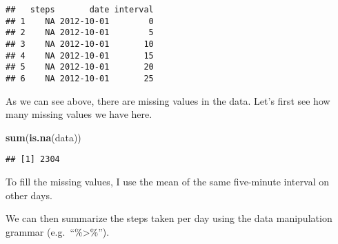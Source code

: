 \documentclass[
]{article}
\newenvironment{Shaded}{\begin{snugshade}}{\end{snugshade}}
\newcommand{\CommentTok}[1]{\textcolor[rgb]{0.56,0.35,0.01}{\textit{#1}}}
\newcommand{\ControlFlowTok}[1]{\textcolor[rgb]{0.13,0.29,0.53}{\textbf{#1}}}
\newcommand{\DataTypeTok}[1]{\textcolor[rgb]{0.13,0.29,0.53}{#1}}
\newcommand{\DecValTok}[1]{\textcolor[rgb]{0.00,0.00,0.81}{#1}}
\newcommand{\KeywordTok}[1]{\textcolor[rgb]{0.13,0.29,0.53}{\textbf{#1}}}
\newcommand{\NormalTok}[1]{#1}
\newcommand{\OperatorTok}[1]{\textcolor[rgb]{0.81,0.36,0.00}{\textbf{#1}}}
\newcommand{\OtherTok}[1]{\textcolor[rgb]{0.56,0.35,0.01}{#1}}
\newcommand{\StringTok}[1]{\textcolor[rgb]{0.31,0.60,0.02}{#1}}
\begin{document}
\begin{verbatim}
##   steps       date interval
## 1    NA 2012-10-01        0
## 2    NA 2012-10-01        5
## 3    NA 2012-10-01       10
## 4    NA 2012-10-01       15
## 5    NA 2012-10-01       20
## 6    NA 2012-10-01       25
\end{verbatim}

As we can see above, there are missing values in the data. Let's first
see how many missing values we have here.

\begin{Shaded}
\begin{Highlighting}[]
\KeywordTok{sum}\NormalTok{(}\KeywordTok{is.na}\NormalTok{(data))}
\end{Highlighting}
\end{Shaded}

\begin{verbatim}
## [1] 2304
\end{verbatim}

To fill the missing values, I use the mean of the same five-minute
interval on other days.

\begin{Shaded}
\end{Shaded}

We can then summarize the steps taken per day using the data
manipulation grammar (e.g.~``\%\textgreater\%'').
\end{document}
